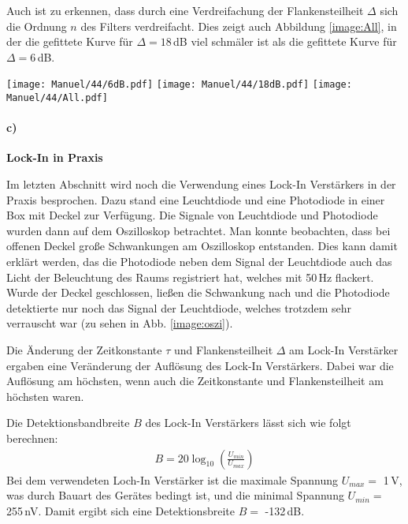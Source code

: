 Auch ist zu erkennen, dass durch eine Verdreifachung der Flankensteilheit $\Delta$ sich die Ordnung $n$ des Filters verdreifacht. Dies zeigt auch Abbildung \ref{image:All}, in der die gefittete Kurve für $\Delta=18$\,dB viel schmäler ist als die gefittete Kurve für $\Delta=6$\,dB.
\newpage
\begin{center}
    \texttt{[image: Manuel/44/6dB.pdf]}
    \label{image:6dB}
    \vspace{1cm}
    \texttt{[image: Manuel/44/18dB.pdf]}
    \label{image:18dB}
    \vspace{1cm}
    \texttt{[image: Manuel/44/All.pdf]}
    \label{image:All}
\end{center}

\paragraph{c)}\textbf{Lock-In in Praxis}

Im letzten Abschnitt wird noch die Verwendung eines Lock-In Verstärkers in der Praxis besprochen. Dazu stand eine Leuchtdiode und eine Photodiode in einer Box mit Deckel zur Verfügung. Die Signale von Leuchtdiode und Photodiode wurden dann auf dem Oszilloskop betrachtet. Man konnte beobachten, dass bei offenen Deckel große Schwankungen am Oszilloskop entstanden. Dies kann damit erklärt werden, das die Photodiode neben dem Signal der Leuchtdiode auch das Licht der Beleuchtung des Raums registriert hat, welches mit 50\,Hz flackert. Wurde der Deckel geschlossen, ließen die Schwankung nach und die Photodiode detektierte nur noch das Signal der Leuchtdiode, welches trotzdem sehr verrauscht war (zu sehen in Abb. \ref{image:oszi}). 

Die Änderung der Zeitkonstante $\tau$ und Flankensteilheit $\Delta$ am Lock-In Verstärker ergaben eine Veränderung der Auflösung des Lock-In Verstärkers. Dabei war die Auflösung am höchsten, wenn auch die Zeitkonstante und Flankensteilheit am höchsten waren.


Die Detektionsbandbreite $B$ des Lock-In Verstärkers lässt sich wie folgt berechnen:
\begin{gather}
    B = 20\log_{10}\left(\frac{U_{min}}{U_{max}}\right)
\end{gather}
Bei dem verwendeten Loch-In Verstärker ist die maximale Spannung $U_{max}=$ 1\,V, was durch Bauart des Gerätes bedingt ist, und die minimal Spannung $U_{min} =$ 255\,nV. Damit ergibt sich eine Detektionsbreite $B =$ -132\,dB.
